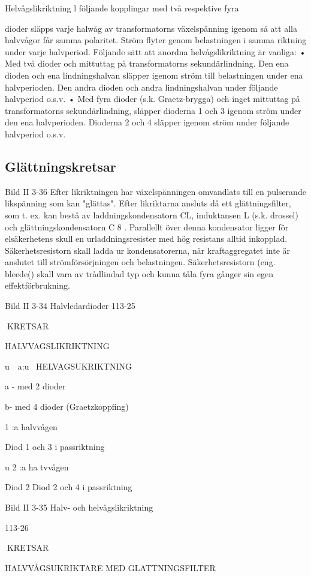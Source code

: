 Helvågslikriktning
l följande kopplingar med två respektive fyra

dioder släpps varje halwåg av transformatorns växelspänning igenom så att alla halvvågor får samma polaritet. Ström flyter genom belastningen i samma riktning under
varje halvperiod. Följande sätt att anordna
helvågslikriktning är vanliga:
• Med två dioder och mittuttag på transformatorns sekundärlindning. Den ena dioden och ena lindningshalvan släpper igenom ström till belastningen under ena halvperioden. Den andra dioden och andra
lindningshalvan under följande halvperiod
o.s.v.
• Med fyra dioder (s.k. Graetz-brygga) och
inget mittuttag på transformatorns sekundärlindning, släpper dioderna 1 och 3 igenom ström under den ena halvperioden.
Dioderna 2 och 4 släpper igenom ström
under följande halvperiod o.s.v.

\subsection{Glättningskretsar}
Bild II 3-36
Efter likriktningen har växelspänningen omvandlats till en pulserande likspänning som
kan "glättas". Efter likriktarna ansluts då ett
glättningsfilter, som t. ex. kan bestå av laddningskondensatorn CL, induktansen L (s.k.
drossel) och glättningskondensatorn C 8 .
Parallellt över denna kondensator ligger för
elsäkerhetens skull en urladdningsresister
med hög resistans alltid inkopplad.
Säkerhetsresistorn skall ladda ur kondensatorerna, när kraftaggregatet inte är
anslutet till strömförsörjningen och belastningen. Säkerhetsresistorn (eng. bleede()
skall vara av trådlindad typ och kunna tåla
fyra gånger sin egen effektförbrukning.

Bild II 3-34 Halvledardioder
113-25

KRETSAR

HALVVAGSLIKRIKTNING

u~~a:u~
HELVAGSUKRIKTNING

a - med 2 dioder

b- med 4 dioder
(Graetzkoppfing)

1 :a halvvågen

Diod 1 och 3 i passriktning

u
2 :a ha tvvågen

Diod 2 Diod 2 och 4 i passriktning

Bild II 3-35 Halv- och helvågslikriktning

113-26

KRETSAR

HALVVÅGSUKRIKTARE MED GLATTNINGSFILTER

